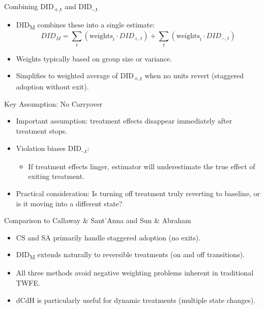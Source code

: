 \documentclass{beamer}
\begin{document}
\begin{frame}{Combining DID\textsubscript{+,t} and DID\textsubscript{-,t}}
\begin{itemize}
\item DID\textsubscript{M} combines these into a single estimate:
\[
DID_M = \sum_t \left(\text{weights}_t \cdot DID_{+,t}\right) + \sum_t \left(\text{weights}_t \cdot DID_{-,t}\right)
\]
\item Weights typically based on group size or variance.
\item Simplifies to weighted average of DID\textsubscript{+,t} when no units revert (staggered adoption without exit).
\end{itemize}
\end{frame}

\begin{frame}{Key Assumption: No Carryover}
\begin{itemize}
\item Important assumption: treatment effects disappear immediately after treatment stops.
\item Violation biases DID\textsubscript{-,t}:
\begin{itemize}
    \item If treatment effects linger, estimator will underestimate the true effect of exiting treatment.
\end{itemize}
\item Practical consideration: Is turning off treatment truly reverting to baseline, or is it moving into a different state?
\end{itemize}
\end{frame}

\begin{frame}{Comparison to Callaway \& Sant'Anna and Sun \& Abraham}
\begin{itemize}
\item CS and SA primarily handle staggered adoption (no exits).
\item DID\textsubscript{M} extends naturally to reversible treatments (on and off transitions).
\item All three methods avoid negative weighting problems inherent in traditional TWFE.
\item dCdH is particularly useful for dynamic treatments (multiple state changes).
\end{itemize}
\end{frame}
\end{document}
